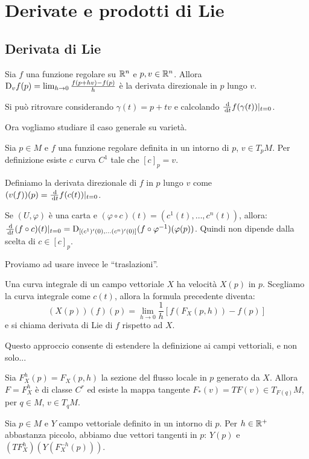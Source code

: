 \chapter{Derivate e prodotti di Lie}

\section{Derivata di Lie}
Sia $f$ una funzione regolare su $\mathbb R^n$ e $p,v\in\mathbb R^n$. Allora $\mathrm D_vf(p)=\lim_{h\to 0} \frac{f(p+hv)-f(p)}h$ è la derivata direzionale in $p$ lungo $v$.

Si può ritrovare considerando $\gamma(t)=p+tv$ e calcolando $\frac {\,\mathrm d}{\,\mathrm d t} f(\gamma(t))|_{t=0}$.

Ora vogliamo studiare il caso generale su varietà.

Sia $p\in M$ e $f$ una funzione regolare definita in un intorno di $p$, $v \in T_{p}M$. Per definizione esiste $c$ curva $C^1$ tale che $[c]_p=v$.

\begin{definition}
	Definiamo la derivata direzionale di $f$ in $p$ lungo $v$ come \\ $(v(f))(p)=\frac {\,\mathrm d} {\,\mathrm d t} f(c(t))|_{t=0}$.
\end{definition}

Se $(U,\varphi)$ è una carta e $(\varphi\circ c)(t)=(c^1(t),\ldots,c^n(t))$, allora: \\
$\frac {\,\mathrm d}{\,\mathrm d t} (f\circ c)(t)|_{t=0}=\mathrm D_{[(c^1)'(0),\ldots(c^n)'(0)]}(f\circ\varphi^{-1})(\varphi(p))$. Quindi non dipende dalla scelta di $c\in[c]_p$.

Proviamo ad usare invece le ``traslazioni''.

Una curva integrale di un campo vettoriale $X$ ha velocità $X(p)$ in $p$. Scegliamo la curva integrale come $c(t)$, allora la formula precedente diventa:
\begin{equation*}
	(X(p))(f)(p)=\lim_{h\to 0} \frac 1h [f(F_X(p,h))-f(p)]
\end{equation*}
e si chiama derivata di Lie di $f$ rispetto ad $X$.

Questo approccio consente di estendere la definizione ai campi vettoriali, e non solo...

Sia $F_X^h(p)=F_X(p,h)$ la sezione del flusso locale in $p$ generato da $X$. Allora $F=F_X^h$ è di classe $C^r$ ed esiste la mappa tangente $F_*(v)=TF(v)\in T_{F(q)}M$, per $q\in M$, $v\in T_qM$.

Sia $p\in M$ e $Y$ campo vettoriale definito in un intorno di $p$. Per $h\in\mathbb R^+$ abbastanza piccolo, abbiamo due vettori tangenti in $p$: $Y(p)$ e $(TF_X^h)(Y(F_X^{-h}(p)))$.

